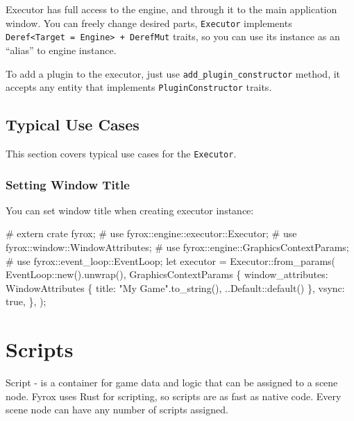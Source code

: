 \documentclass[
]{book}
\newenvironment{Shaded}{\begin{snugshade}}{\end{snugshade}}
\newcommand{\NormalTok}[1]{#1}
\theoremstyle{definition}
\theoremstyle{definition}
\theoremstyle{definition}
\theoremstyle{definition}
\theoremstyle{remark}
\begin{document}
Executor has full access to the engine, and through it to the main application window. You can freely change desired parts, \texttt{Executor} implements \texttt{Deref\textless{}Target\ =\ Engine\textgreater{}\ +\ DerefMut} traits, so you can use its instance as an ``alias'' to engine instance.

To add a plugin to the executor, just use \texttt{add\_plugin\_constructor} method, it accepts any entity that implements \texttt{PluginConstructor} traits.

\subsection{Typical Use Cases}\label{typical-use-cases}

This section covers typical use cases for the \texttt{Executor}.

\subsubsection{Setting Window Title}\label{setting-window-title}

You can set window title when creating executor instance:

\begin{Shaded}
\begin{Highlighting}[]
\NormalTok{\# extern crate fyrox;}
\NormalTok{\# use fyrox::engine::executor::Executor;}
\NormalTok{\# use fyrox::window::WindowAttributes;}
\NormalTok{\# use fyrox::engine::GraphicsContextParams;}
\NormalTok{\# use fyrox::event\_loop::EventLoop;}
\NormalTok{let executor = Executor::from\_params(}
\NormalTok{    EventLoop::new().unwrap(),}
\NormalTok{    GraphicsContextParams \{}
\NormalTok{        window\_attributes: WindowAttributes \{}
\NormalTok{            title: "My Game".to\_string(),}
\NormalTok{            ..Default::default()}
\NormalTok{        \},}
\NormalTok{        vsync: true,}
\NormalTok{    \},}
\NormalTok{);}
\end{Highlighting}
\end{Shaded}

\section{Scripts}\label{scripts-1}

Script - is a container for game data and logic that can be assigned to a scene node. Fyrox uses Rust for scripting, so scripts are as fast as native code. Every scene node can have any number of scripts assigned.
\end{document}

